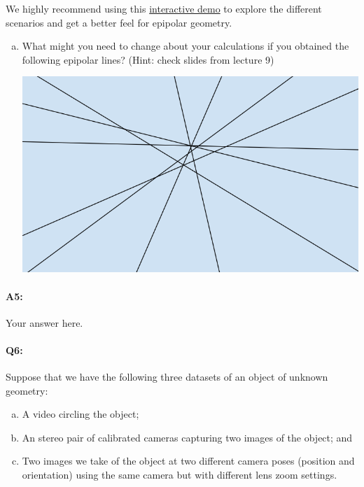 We highly recommend using this \href{https://browncsci1430.github.io/webpage/demos/stereo_camera_visualization/index.html}{interactive demo} to explore the different scenarios and get a better feel for epipolar geometry.
\begin{enumerate}[(c)]
\item What might you need to change about your calculations if you obtained the following epipolar lines? (Hint: check slides from lecture 9)

\includegraphics[width = 0.25\linewidth]{q3-c.PNG}
\end{enumerate}


\paragraph{A5:} Your answer here.






\pagebreak
\paragraph{Q6:}
Suppose that we have the following three datasets of an object of unknown geometry:
\begin{enumerate}[(a)]
\item A video circling the object;
\item An stereo pair of calibrated cameras capturing two images of the object; and
\item Two images we take of the object at two different camera poses (position and orientation) using the same camera but with different lens zoom settings.
\end{enumerate}

